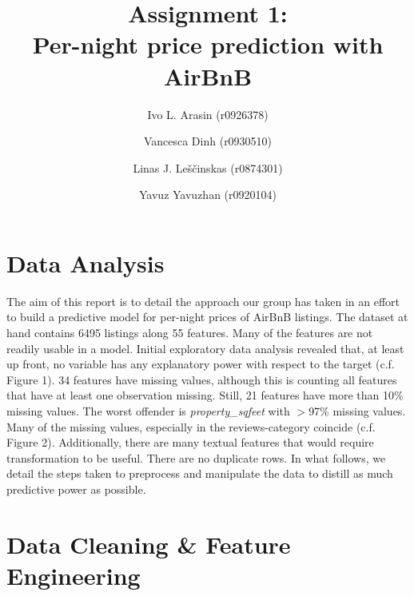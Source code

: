 \documentclass[11pt, oneside]{article}   	%
\title{Assignment 1: \\ Per-night price prediction with AirBnB}
\author{\centering Ivo L. Arasin (r0926378) \and Vancesca Dinh (r0930510) \and Linas J. Leščinskas (r0874301) \and Yavuz Yavuzhan (r0920104)}
\begin{document}
\maketitle
\section{Data Analysis}
The aim of this report is to detail the approach our group has taken in an effort to build a predictive model for per-night prices of AirBnB listings. The dataset at hand contains 6495 listings along 55 features. Many of the features are not readily usable in a model. Initial exploratory data analysis revealed that, at least up front, no variable has any explanatory power with respect to the target (c.f. Figure 1). 34 features have missing values, although this is counting all features that have at least one observation missing. Still, 21 features have more than 10\% missing values. The worst offender is \textit{property\_sqfeet} with $>$97\% missing values. Many of the missing values, especially in the reviews-category coincide (c.f. Figure 2). Additionally, there are many textual features that would require transformation to be useful. There are no duplicate rows. \newline
In what follows, we detail the steps taken to preprocess and manipulate the data to distill as much predictive power as possible. 
\section{Data Cleaning \& Feature Engineering}
\end{document}

